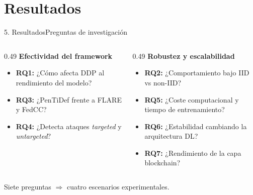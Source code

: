 
\section{Resultados}

\begin{frame}{5. Resultados}{Preguntas de investigación}
  \begin{columns}[T]
    \begin{column}{0.49\textwidth}
      \textbf{Efectividad del framework}\\[0.3em]
      \begin{itemize}\small
        \item \textbf{RQ1:} ¿Cómo afecta DDP al rendimiento del modelo?
        \item \textbf{RQ3:} ¿PenTiDef frente a FLARE y FedCC?
        \item \textbf{RQ4:} ¿Detecta ataques \textit{targeted} y \textit{untargeted}?
      \end{itemize}
    \end{column}
    \begin{column}{0.49\textwidth}
      \textbf{Robustez y escalabilidad}\\[0.3em]
      \begin{itemize}\small
        \item \textbf{RQ2:} ¿Comportamiento bajo IID vs non-IID?
        \item \textbf{RQ5:} ¿Coste computacional y tiempo de entrenamiento?
        \item \textbf{RQ6:} ¿Estabilidad cambiando la arquitectura DL?
        \item \textbf{RQ7:} ¿Rendimiento de la capa blockchain?
      \end{itemize}
    \end{column}
  \end{columns}
  \vfill
  \begin{block}{}
    \centering Siete preguntas $\Rightarrow$ cuatro escenarios experimentales.
  \end{block}
\end{frame}

